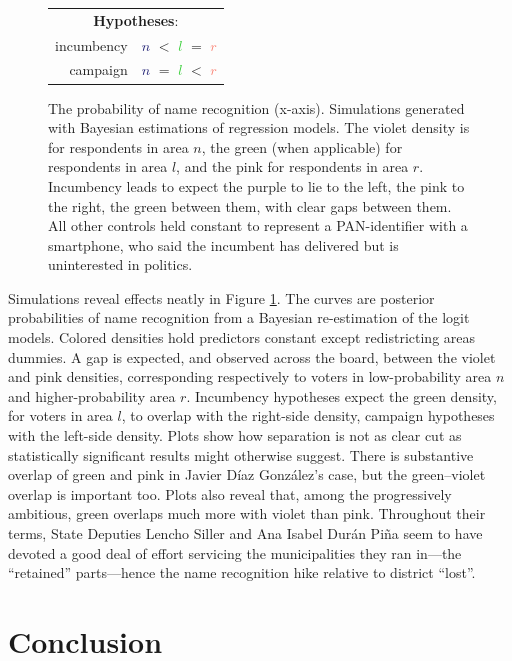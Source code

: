 \documentclass[letter,12pt]{article}
\begin{document}
\begin{figure}
\begin{tabular}{|rc|}
  \hline \multicolumn{2}{|c|}{\textbf{Hypotheses}:} \\
  incumbency & \textcolor{MidnightBlue}{$n$} $<$ \textcolor{LimeGreen}{$l$} $=$ \textcolor{Salmon}{$r$} \\
  campaign   & \textcolor{MidnightBlue}{$n$} $=$ \textcolor{LimeGreen}{$l$} $<$ \textcolor{Salmon}{$r$} \\ \hline
\end{tabular}
\caption{The probability of name recognition (x-axis). Simulations generated with Bayesian estimations of regression models. The violet density is for respondents in area $n$, the green (when applicable) for respondents in area $l$, and the pink for respondents in area $r$. Incumbency leads to expect the purple to lie to the left, the pink to the right, the green between them, with clear gaps between them. All other controls held constant to represent a PAN-identifier with a smartphone, who said the incumbent has delivered but is uninterested in politics.}\label{f:sims}
\end{figure}

Simulations reveal effects neatly in Figure \ref{f:sims}. The curves are posterior probabilities of name recognition from a Bayesian re-estimation of the logit models. Colored densities hold predictors constant except redistricting areas dummies. A gap is expected, and observed across the board, between the violet and pink densities, corresponding respectively to voters in low-probability area $n$ and higher-probability area $r$. Incumbency hypotheses expect the green density, for voters in area $l$, to overlap with the right-side density, campaign hypotheses with the left-side density. Plots show how separation is not as clear cut as statistically significant results might otherwise suggest. There is substantive overlap of green and pink in Javier Díaz González's case, but the green--violet overlap is important too. Plots also reveal that, among the progressively ambitious, green overlaps much more with violet than pink. Throughout their terms, State Deputies Lencho Siller and Ana Isabel Durán Piña seem to have devoted a good deal of effort servicing the municipalities they ran in---the ``retained'' parts---hence the name recognition hike relative to district ``lost''.

\section{Conclusion}
\end{document}
